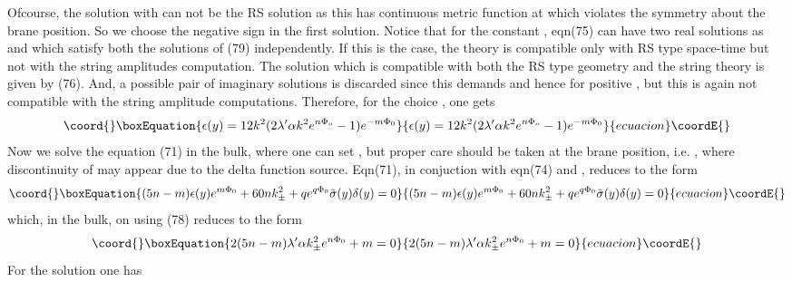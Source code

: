 \documentclass[a4paper,12pt]{article}
\providecommand {\nn} {\nonumber}
\begin{document}
Ofcourse, the solution with \coordHE{} can not be the RS solution as this 
has continuous metric function at \coordHE{} which violates the symmetry about 
the brane position. So we choose the negative sign in the first solution. 
Notice that for the constant \coordHE{}, 
eqn(75) can have two real solutions as \coordHE{} and \coordHE{} which satisfy both the solutions of (79) 
independently. If this is the case, the theory is compatible only 
with RS type space-time but not with the string amplitudes computation. 
 The solution which is compatible with both the RS type geometry and the 
string theory is given by (76). And, a  possible pair of imaginary solutions 
is discarded since this demands \coordHE{} and hence \coordHE{} for 
positive \myHighlight{$\alpha$}\coordHE{}, but this is again not compatible with the string amplitude 
computations. Therefore, for the choice \coordHE{}, one gets
\begin{equation}\coord{}\boxEquation{
\epsilon(y)=12k^2(2\lambda'\alpha k^2 e^{n\Phi_o}-1) e^{-m\Phi_0}
}{
\epsilon(y)=12k^2(2\lambda'\alpha k^2 e^{n\Phi_o}-1) e^{-m\Phi_0}
}{ecuacion}\coordE{}\end{equation}
   Now we solve the equation (71) in the bulk, where one can set 
\coordHE{}, but proper care should be taken at the brane 
position, i.e. \coordHE{}, where discontinuity of \coordHE{} may appear due to 
the delta function source. Eqn(71), in conjuction with eqn(74) and 
\coordHE{}, reduces to the form
\begin{equation}\coord{}\boxEquation{
(5n-m)\epsilon(y)e^{m\Phi_0}+60n k_{\pm}^2
+q e^{q\Phi_0}\tilde{\sigma}(y)\delta(y)=0\nn
}{
(5n-m)\epsilon(y)e^{m\Phi_0}+60n k_{\pm}^2
+q e^{q\Phi_0}\tilde{\sigma}(y)\delta(y)=0\nn
}{ecuacion}\coordE{}\end{equation}
which, in the bulk, on using (78) reduces to the form
\begin{equation}\coord{}\boxEquation{
2(5n-m)\lambda'\alpha k_{\pm}^2 e^{n\Phi_0}+m=0
}{
2(5n-m)\lambda'\alpha k_{\pm}^2 e^{n\Phi_0}+m=0
}{ecuacion}\coordE{}\end{equation}
For the solution \coordHE{} one has
\end{document}

